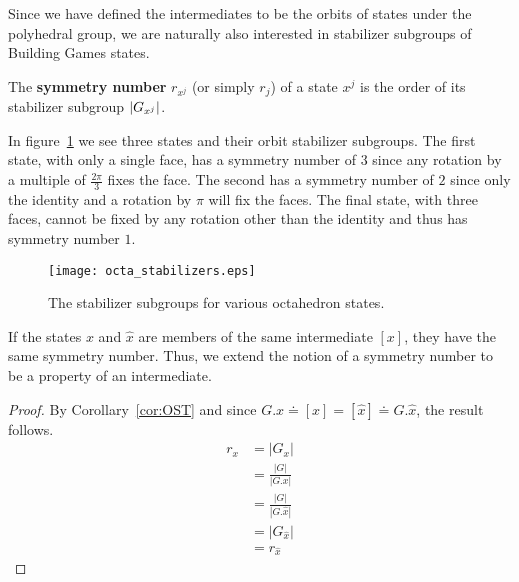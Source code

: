 Since we have defined the intermediates to be the orbits of states under the polyhedral group, we are naturally also interested in stabilizer subgroups of Building Games states.
\begin{mydef}
The \textbf{symmetry number} $r_{x^j}$ (or simply $r_j$) of a state $x^j$ is the order of its stabilizer subgroup $\left|{G}_{x^j}\right|$.
\end{mydef}
In figure~\ref{fig:OctaStabs} we see three states and their orbit stabilizer subgroups. The first state, with only a single face, has a symmetry number of $3$ since any rotation by a multiple of $\frac{2\pi}{3}$ fixes the face. The second has a symmetry number of $2$ since only the identity and a rotation by $\pi$ will fix the faces. The final state, with three faces, cannot be fixed by any rotation other than the identity and thus has symmetry number $1$.  
\begin{figure}[ht]
        \centering
  \texttt{[image: octa\_stabilizers.eps]}
\caption{The stabilizer subgroups for various octahedron states.}
\label{fig:OctaStabs}
\end{figure}

\begin{mythm}
If the states $x$ and $\hat{x}$ are members of the same intermediate $\left[x\right]$, they have the same symmetry number. Thus, we extend the notion of a symmetry number to be a property of an intermediate.
\end{mythm}
\begin{proof}
By Corollary~\ref{cor:OST} and since $G.x \doteq [x] = [\hat{x}] \doteq G.\hat{x}$, the result follows.
\begin{align}
  r_x &= |G_x| \\
  &= \frac{|G|}{|G.x|} \\
  &= \frac{|G|}{|G.\hat{x}|} \\
  &= |G_{\hat{x}}| \\
  &= r_{\hat{x}}
\end{align}
\end{proof}




